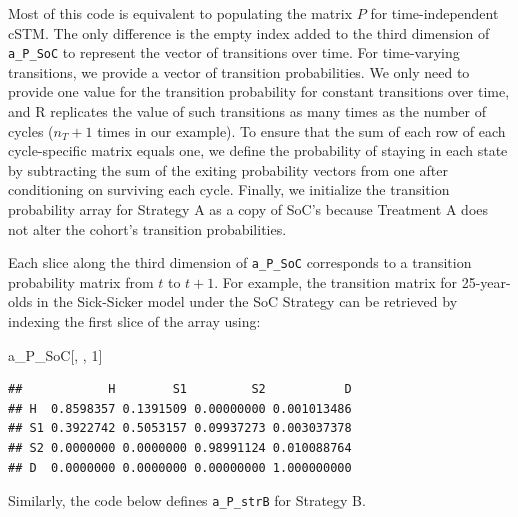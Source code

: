 \documentclass[
]{article}
\newenvironment{Shaded}{\begin{snugshade}}{\end{snugshade}}
\newcommand{\DecValTok}[1]{\textcolor[rgb]{0.00,0.00,0.81}{#1}}
\newcommand{\NormalTok}[1]{#1}
\begin{document}
Most of this code is equivalent to populating the matrix \(P\) for time-independent cSTM. The only difference is the empty index added to the third dimension of \texttt{a\_P\_SoC} to represent the vector of transitions over time. For time-varying transitions, we provide a vector of transition probabilities. We only need to provide one value for the transition probability for constant transitions over time, and R replicates the value of such transitions as many times as the number of cycles (\(n_T+1\) times in our example). To ensure that the sum of each row of each cycle-specific matrix equals one, we define the probability of staying in each state by subtracting the sum of the exiting probability vectors from one after conditioning on surviving each cycle. Finally, we initialize the transition probability array for Strategy A as a copy of SoC's because Treatment A does not alter the cohort's transition probabilities.

Each slice along the third dimension of \texttt{a\_P\_SoC} corresponds to a transition probability matrix from \(t\) to \(t+1\). For example, the transition matrix for 25-year-olds in the Sick-Sicker model under the SoC Strategy can be retrieved by indexing the first slice of the array using:

\begin{Shaded}
\begin{Highlighting}[]
\NormalTok{a\_P\_SoC[, , }\DecValTok{1}\NormalTok{]}
\end{Highlighting}
\end{Shaded}

\begin{verbatim}
##            H        S1         S2           D
## H  0.8598357 0.1391509 0.00000000 0.001013486
## S1 0.3922742 0.5053157 0.09937273 0.003037378
## S2 0.0000000 0.0000000 0.98991124 0.010088764
## D  0.0000000 0.0000000 0.00000000 1.000000000
\end{verbatim}

Similarly, the code below defines \texttt{a\_P\_strB} for Strategy B.
\end{document}
